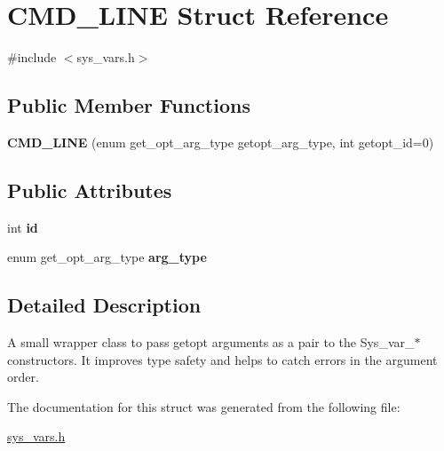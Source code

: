 \hypertarget{structCMD__LINE}{}\section{C\+M\+D\+\_\+\+L\+I\+NE Struct Reference}
\label{structCMD__LINE}


{\ttfamily \#include $<$sys\+\_\+vars.\+h$>$}

\subsection*{Public Member Functions}
\begin{DoxyCompactItemize}
\item 
\mbox{\label{structCMD__LINE_a79fb8e2fb5fdcb589f2dde5b8f93aabc}} 
{\bfseries C\+M\+D\+\_\+\+L\+I\+NE} (enum get\+\_\+opt\+\_\+arg\+\_\+type getopt\+\_\+arg\+\_\+type, int getopt\+\_\+id=0)
\end{DoxyCompactItemize}
\subsection*{Public Attributes}
\begin{DoxyCompactItemize}
\item 
\mbox{\label{structCMD__LINE_a58dd2cbc82d7295be22cf1f935d8eb43}} 
int {\bfseries id}
\item 
\mbox{\label{structCMD__LINE_abe703710658c4979ac56500cdd5981fb}} 
enum get\+\_\+opt\+\_\+arg\+\_\+type {\bfseries arg\+\_\+type}
\end{DoxyCompactItemize}


\subsection{Detailed Description}
A small wrapper class to pass getopt arguments as a pair to the Sys\+\_\+var\+\_\+$\ast$ constructors. It improves type safety and helps to catch errors in the argument order. 

The documentation for this struct was generated from the following file\+:\begin{DoxyCompactItemize}
\item 
\mbox{\hyperlink{sys__vars_8h}{sys\+\_\+vars.\+h}}\end{DoxyCompactItemize}
